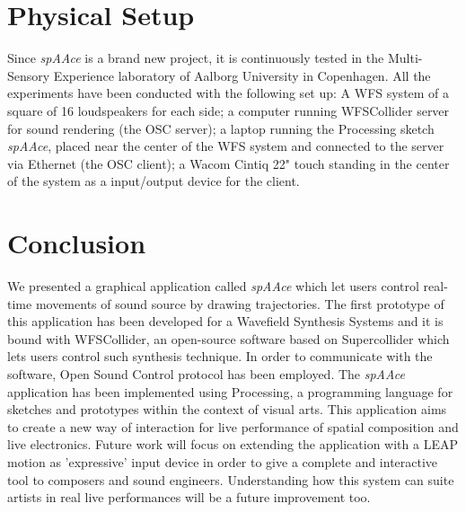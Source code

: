 \documentclass[journal]{IEEEtran}
\begin{document}
\section{Physical Setup}
Since \textit{spAAce} is a brand new project, it is continuously tested in the Multi-Sensory Experience laboratory of Aalborg University in Copenhagen. All the experiments have been conducted with the following set up: A WFS system of a square of 16 loudspeakers for each side; a computer running WFSCollider server for sound rendering (the OSC server); a laptop running the Processing sketch \emph{spAAce}, placed near the center of the WFS system and connected to the server via Ethernet (the OSC client); a Wacom Cintiq 22" touch standing in the center of the system as a input/output device for the client.


\section{Conclusion}
We presented a graphical application called \emph{spAAce} which let users control real-time movements of sound source by drawing trajectories. The first prototype of this application has been developed for a Wavefield Synthesis Systems and it is bound with WFSCollider, an open-source software based on Supercollider which lets users control such synthesis technique. In order to communicate with the software, Open Sound Control protocol has been employed. The \emph{spAAce} application has been implemented using Processing, a programming language for sketches and prototypes within the context of visual arts. This application aims to create a new way of interaction for live performance of spatial composition and live electronics.
Future work will focus on extending the application with a LEAP motion as 'expressive' input device in order to give a complete and interactive tool to composers and sound engineers. Understanding how this system can suite artists in real live performances will be a future improvement too.

\ifCLASSOPTIONcaptionsoff
  \newpage
\fi




\end{document}
